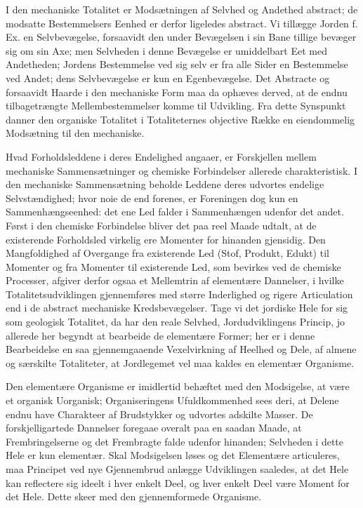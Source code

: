 \documentclass[11pt]{book}
\newcommand{\opage}[1]{\marginnote{\footnotesize\textit{[#1]}}}
\begin{document}
I den mechaniske Totalitet er Modsætningen af Selvhed og Andethed abstract; de
modsatte Bestemmelsers Eenhed er derfor ligeledes abstract. Vi tillægge Jorden
f. Ex. en Selvbevægelse, forsaavidt den under Bevægelsen i sin Bane tillige
bevæger sig om sin Axe; men Selvheden i denne Bevægelse er umiddelbart Eet med
Andetheden; Jordens Bestemmelse ved sig selv er fra alle Sider en Bestemmelse
ved Andet; dens Selvbevægelse er kun en Egenbevægelse. Det Abstracte og
forsaavidt Haarde i den mechaniske Form maa da ophæves derved, at de endnu
tilbagetrængte Mellembestemmelser komme til Udvikling. Fra dette Synspunkt
danner den organiske Totalitet i Totaliteternes objective Række en
eiendommelig Modsætning til den mechaniske.

Hvad Forholdsleddene i deres Endelighed angaaer, er Forskjellen mellem
mechaniske Sammensætninger og chemiske Forbindelser allerede charakteristisk.
I den mechaniske Sammensætning beholde Leddene deres udvortes endelige
Selvstændighed; hvor noie de end forenes, er Foreningen dog kun en
Sammenhængseenhed: det ene Led falder i Sammenhængen udenfor det andet. Først
i den chemiske Forbindelse bliver
\opage{131} \setcounter{footnote}{0}%
det paa reel Maade udtalt, at de existerende Forholdsled virkelig ere Momenter
for hinanden gjensidig. Den Mangfoldighed af Overgange fra existerende Led
(Stof, Produkt, Edukt) til Momenter og fra Momenter til existerende Led, som
bevirkes ved de chemiske Processer, afgiver derfor ogsaa et Mellemtrin af
elementære Dannelser, i hvilke Totalitetsudviklingen gjennemføres med større
Inderlighed og rigere Articulation end i de abstract mechaniske
Kredsbevægelser. Tage vi det jordiske Hele for sig som geologisk Totalitet, da
har den reale Selvhed, Jordudviklingens Princip, jo allerede her begyndt at
bearbeide de elementære Former; her er i denne Bearbeidelse en saa
gjennemgaaende Vexelvirkning af Heelhed og Dele, af almene og særskilte
Totaliteter, at Jordlegemet vel maa kaldes en elementær Organisme.

Den elementære Organisme er imidlertid behæftet med den Modsigelse, at være et
organisk Uorganisk; Organiseringens Ufuldkommenhed sees deri, at Delene endnu
have Charakteer af Brudstykker og udvortes adskilte Masser. De
forskjelligartede Dannelser foregaae overalt paa en saadan Maade, at
Frembringelserne og det Frembragte falde udenfor hinanden; Selvheden i dette
Hele er kun elementær. Skal Modsigelsen løses og det Elementære articuleres,
maa Principet ved nye Gjennembrud anlægge Udviklingen saaledes, at det Hele
kan reflectere sig ideelt i hver enkelt Deel, og hver enkelt Deel være Moment
for det Hele. Dette skeer med den gjennemformede Organisme.
\end{document}
